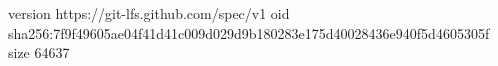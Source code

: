 version https://git-lfs.github.com/spec/v1
oid sha256:7f9f49605ae04f41d41c009d029d9b180283e175d40028436e940f5d4605305f
size 64637
